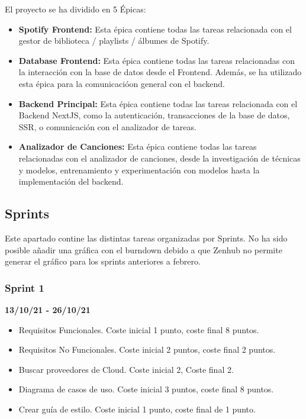 El proyecto se ha dividido en 5 Épicas:
\begin{itemize}
    \item \textbf{Spotify Frontend:} Esta épica contiene todas las tareas relacionada con el gestor de biblioteca / playlists / álbumes de Spotify. 
    \item \textbf{Database Frontend:} Esta épica contiene todas las tareas relacionadas con la interacción con la base de datos desde el Frontend. Además, se ha utilizado esta épica para la comunicacióon general con el backend. 
    \item \textbf{Backend Principal:} Esta épica contiene todas las tareas relacionada con el Backend NextJS, como la autenticación, transacciones de la base de datos, SSR, o comunicación con el analizador de tareas.
    
    \item \textbf{Analizador de Canciones:} Esta épica contiene todas las tareas relacionadas con el analizador de canciones, desde la investigación de técnicas y modelos, entrenamiento y experimentación con modelos hasta la implementación del backend. 
\end{itemize}

\subsection{Sprints}
Este apartado contine las distintas tareas organizadas por Sprints. No ha sido posible añadir una gráfica con el burndown debido a que Zenhub no permite generar el gráfico para los sprints anteriores a febrero. 

\subsubsection{Sprint 1}
\textbf{13/10/21 - 26/10/21}

\begin{itemize}
    \item Requisitos Funcionales. Coste inicial 1 punto, coste final  8 puntos. 
    \item Requisitos No Funcionales. Coste inicial  2 puntos, coste final 2 puntos.
    \item Buscar proveedores de Cloud. Coste inicial 2, Coste final 2.
    \item Diagrama de casos de uso. Coste inicial 3 puntos, coste final 8 puntos.
    \item Crear guía de estilo. Coste inicial 1 punto, coste final de 1 punto.
\end{itemize}


